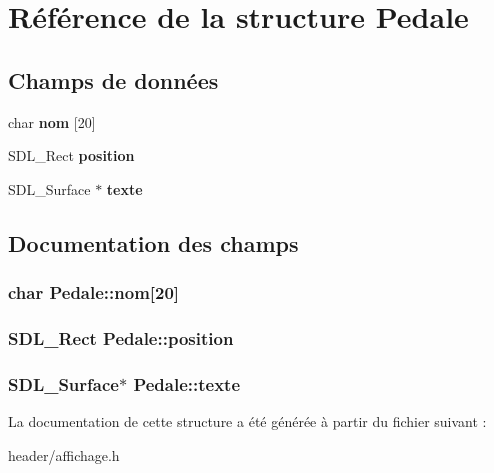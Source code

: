 \hypertarget{structPedale}{}\section{Référence de la structure Pedale}
\label{structPedale}
\subsection*{Champs de données}
\begin{DoxyCompactItemize}
\item 
char {\bfseries nom} \mbox{[}20\mbox{]}\hypertarget{structPedale_abe76a0a74cb780af8d9f2c19bf9f54b6}{}\label{structPedale_abe76a0a74cb780af8d9f2c19bf9f54b6}

\item 
S\+D\+L\+\_\+\+Rect {\bfseries position}\hypertarget{structPedale_aedc7c00a855b7bfbe5eb30343cfd0db3}{}\label{structPedale_aedc7c00a855b7bfbe5eb30343cfd0db3}

\item 
S\+D\+L\+\_\+\+Surface $\ast$ {\bfseries texte}\hypertarget{structPedale_a9cd599cf3cfc349479da33be6b72d465}{}\label{structPedale_a9cd599cf3cfc349479da33be6b72d465}

\end{DoxyCompactItemize}


\subsection{Documentation des champs}
\subsubsection[{\texorpdfstring{nom}{nom}}]{\setlength{\rightskip}{0pt plus 5cm}char Pedale\+::nom\mbox{[}20\mbox{]}}\hypertarget{structPedale_abe76a0a74cb780af8d9f2c19bf9f54b6}{}\label{structPedale_abe76a0a74cb780af8d9f2c19bf9f54b6}
\subsubsection[{\texorpdfstring{position}{position}}]{\setlength{\rightskip}{0pt plus 5cm}S\+D\+L\+\_\+\+Rect Pedale\+::position}\hypertarget{structPedale_aedc7c00a855b7bfbe5eb30343cfd0db3}{}\label{structPedale_aedc7c00a855b7bfbe5eb30343cfd0db3}
\subsubsection[{\texorpdfstring{texte}{texte}}]{\setlength{\rightskip}{0pt plus 5cm}S\+D\+L\+\_\+\+Surface$\ast$ Pedale\+::texte}\hypertarget{structPedale_a9cd599cf3cfc349479da33be6b72d465}{}\label{structPedale_a9cd599cf3cfc349479da33be6b72d465}


La documentation de cette structure a été générée à partir du fichier suivant \+:\begin{DoxyCompactItemize}
\item 
header/affichage.\+h\end{DoxyCompactItemize}
